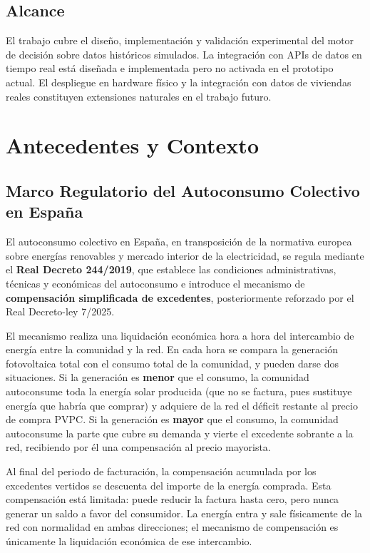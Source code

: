 \documentclass[12pt, a4paper, twoside]{report}
\begin{document}
\section{Alcance}

El trabajo cubre el diseño, implementación y validación experimental del motor
de decisión sobre datos históricos simulados. La integración con APIs de datos
en tiempo real está diseñada e implementada pero no activada en el prototipo
actual. El despliegue en hardware físico y la integración con datos de viviendas
reales constituyen extensiones naturales en el trabajo futuro.

\chapter{Antecedentes y Contexto}
\label{chap:antecedentes}

\section{Marco Regulatorio del Autoconsumo Colectivo en España}

El autoconsumo colectivo en España, en transposición de la normativa europea
sobre energías renovables y mercado interior de la electricidad, se regula
mediante el \textbf{Real Decreto 244/2019}, que establece las condiciones
administrativas, técnicas y económicas del autoconsumo e introduce el mecanismo
de \textbf{compensación simplificada de excedentes}, posteriormente reforzado
por el Real Decreto-ley 7/2025.

El mecanismo realiza una liquidación económica hora a hora del intercambio de
energía entre la comunidad y la red. En cada hora se compara la generación
fotovoltaica total con el consumo total de la comunidad, y pueden darse dos
situaciones. Si la generación es \textbf{menor} que el consumo, la comunidad
autoconsume toda la energía solar producida (que no se factura, pues sustituye
energía que habría que comprar) y adquiere de la red el déficit restante al
precio de compra PVPC. Si la generación es \textbf{mayor} que el consumo, la
comunidad autoconsume la parte que cubre su demanda y vierte el excedente
sobrante a la red, recibiendo por él una compensación al precio mayorista.

Al final del periodo de facturación, la compensación acumulada por los
excedentes vertidos se descuenta del importe de la energía comprada. Esta
compensación está limitada: puede reducir la factura hasta cero, pero nunca
generar un saldo a favor del consumidor. La energía entra y sale físicamente de
la red con normalidad en ambas direcciones; el mecanismo de compensación es
únicamente la liquidación económica de ese intercambio.
\end{document}
